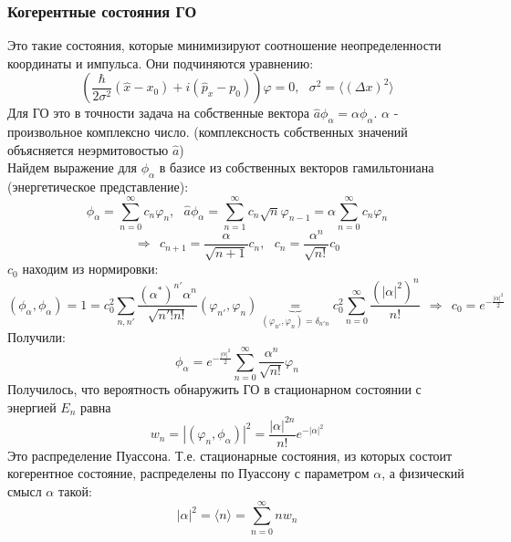 		\subsubsection{Когерентные состояния ГО}
			Это такие состояния, которые минимизируют соотношение неопределенности координаты и импульса. Они подчиняются уравнению:
			$$
				\left(\frac{\hbar}{2\sigma^2}(\hat{x}-x_0) + i(\hat{p}_x-p_0)\right)\varphi = 0, \ \ \ \sigma^2 = \langle(\Delta x)^2\rangle
			$$
			Для ГО это в точности задача на собственные вектора $\hat{a}\phi_{\alpha} = \alpha\phi_{\alpha}$. $\alpha$ - произвольное комплексно число. (комплексность собственных значений объясняется неэрмитовостью $\hat{a}$) \\
			Найдем выражение для $\phi_{\alpha}$ в базисе из собственных векторов гамильтониана (энергетическое представление):
			$$
				\phi_{\alpha} = \sum\limits_{n = 0}^{\infty} c_n\varphi_n, \ \ \ \hat{a}\phi_{\alpha} = \sum\limits_{n = 1}^{\infty}c_n\sqrt{n}\varphi_{n-1}=\alpha\sum\limits_{n = 0}^{\infty}c_n\varphi_n
			$$
			$$
				\Rightarrow \ \ c_{n+1} = \frac{\alpha}{\sqrt{n+1}}c_n, \ \ \ c_n = \frac{\alpha^n}{\sqrt{n!}}c_0
			$$
			$c_0$ находим из нормировки:
			$$
				(\phi_{\alpha},\phi_{\alpha}) = 1 = c_0^2\sum\limits_{n,n'}\frac{(\alpha^{*})^{n'}\alpha^n}{\sqrt{n'!n!}}(\varphi_{n'},\varphi_n) \underbrace{=}_{(\varphi_{n'},\varphi_n)=\delta_{n'n}} c_0^2\sum\limits_{n = 0}^{\infty}\frac{(|\alpha|^2)^n}{n!} \ \ \Rightarrow \ \ c_0 = e^{-\frac{|\alpha|^2}{2}}
			$$
			Получили:
			$$
				\phi_{\alpha} = e^{-\frac{|\alpha|^2}{2}}\sum\limits_{n = 0}^{\infty}\frac{\alpha^n}{\sqrt{n!}}\varphi_n 
			$$
			Получилось, что вероятность обнаружить ГО в стационарном состоянии с энергией $E_n$ равна
			$$
				w_n = |(\varphi_n, \phi_{\alpha})|^2 = \frac{|\alpha|^{2n}}{n!}e^{-|\alpha|^2}
			$$
			Это распределение Пуассона. Т.е. стационарные состояния, из которых состоит когерентное состояние, распределены по Пуассону с параметром $\alpha$, а физический смысл 
			$\alpha$ такой:
			$$
				|\alpha|^2 = \langle n \rangle = \sum\limits_{n = 0}^{\infty}nw_n 
			$$